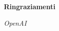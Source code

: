 \thispagestyle{empty}

\begin{center}
  {\bf \Huge Ringraziamenti}
\end{center}

\vspace{4cm}


\emph{
    OpenAI
}
